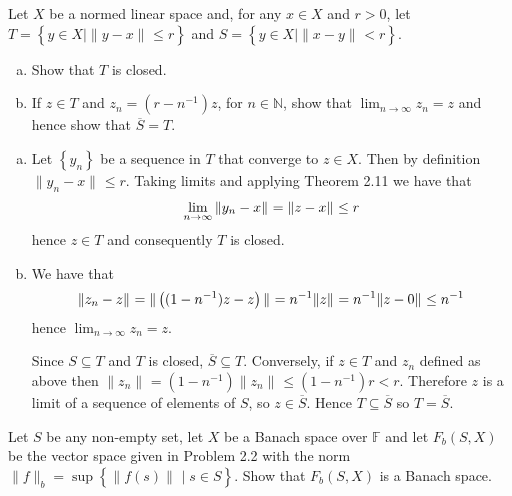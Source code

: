 \documentclass{homework}
\begin{document}
  \begin{problemtext}
    Let $X$ be a normed linear space and, for any $x \in X$ and $r >0$, let $T
    = \left\{ y \in X \mid \|y-x\|_{} \leq r \right\}$ and $S = \left\{ y \in X
    \mid \|x - y\|_{} < r \right\}$.
    \begin{enumerate}[a)]
      \item Show that $T$ is closed.
      \item If $z \in T$ and $z_n = \left( r-n^{-1} \right)z$, for $n \in
        \mathbb{N}$, show that $\lim_{n\to\infty} z_n = z$ and hence show that
        $\overline{S} = T$.
    \end{enumerate}
  \end{problemtext}
  \begin{solution}
    \begin{enumerate}[a)]\hfill
      \item Let $\left\{ y_n \right\}$ be a sequence in $T$ that converge to $z
        \in X$. Then by definition $\|y_n - x\|_{} \leq r$. Taking limits and
        applying Theorem 2.11 we have that
        \begin{equation}
          \notag
          \lim_{n\to\infty} \|y_n - x\|_{} = \|z - x\|_{} \leq r
        \end{equation}
        hence $z \in T$ and consequently $T$ is closed.
      \item We have that
      \begin{equation}
        \notag
        \|z_n - z\|_{} = \|\left( (1 - n^{-1})z - z \right)\|_{} =
        n^{-1}\|z\|_{} = n^{-1}\|z - 0\|_{} \leq n^{-1}
      \end{equation}
      hence $\lim_{n\to\infty} z_n = z$.

      Since $S \subseteq T$ and $T$ is closed, $\overline{S} \subseteq T$.
      Conversely, if $z \in T$ and $z_n$ defined as above then $\|z_n\|_{} =
      \left( 1 - n^{-1} \right)\|z_n\|_{} \leq (1 - n^{-1})r < r$. Therefore
      $z$ is a limit of a sequence of elements of $S$, so $z \in \overline{S}$.
      Hence $T \subseteq \overline{S}$ so $T = \overline{S}$.
    \end{enumerate}
  \end{solution}
  \begin{problemtext}
    Let $S$ be any non-empty set, let $X$ be a Banach space over $\mathbb{F}$
    and let $F_b(S, X)$ be the vector space given in Problem 2.2 with the norm
    $\|f\|_{b} = \sup \left\{ \|f(s)\|_{}\mid s \in S \right\}$. Show that
    $F_b(S, X)$ is a Banach space.
  \end{problemtext}
\end{document}
